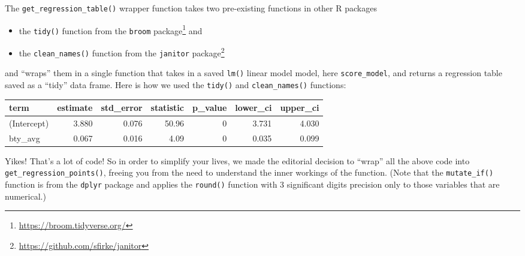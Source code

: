 \documentclass[12pt, krantz2,]{krantz}
\makeatletter
\newenvironment{Shaded}{\begin{snugshade}}{\end{snugshade}}
\newcommand{\DataTypeTok}[1]{\textcolor[rgb]{0.27,0.27,0.27}{#1}}
\newcommand{\DecValTok}[1]{\textcolor[rgb]{0.06,0.06,0.06}{#1}}
\newcommand{\KeywordTok}[1]{\textcolor[rgb]{0.27,0.27,0.27}{\textbf{#1}}}
\newcommand{\NormalTok}[1]{#1}
\newcommand{\OperatorTok}[1]{\textcolor[rgb]{0.43,0.43,0.43}{\textbf{#1}}}
\newcommand{\OtherTok}[1]{\textcolor[rgb]{0.37,0.37,0.37}{#1}}
\newcommand{\StringTok}[1]{\textcolor[rgb]{0.5,0.5,0.5}{#1}}
\providecommand{\tightlist}{%
  \setlength{\itemsep}{0pt}\setlength{\parskip}{0pt}}
\renewcommand{\href}[2]{#2\footnote{\url{#1}}}
\newenvironment{kframe}{%
\medskip{}
\setlength{\fboxsep}{.8em}
 \def\at@end@of@kframe{}%
 \ifinner\ifhmode%
  \def\at@end@of@kframe{\end{minipage}}%
  \begin{minipage}{\columnwidth}%
 \fi\fi%
 \def\FrameCommand##1{\hskip\@totalleftmargin \hskip-\fboxsep
 \colorbox{shadecolor}{##1}\hskip-\fboxsep
     \hskip-\linewidth \hskip-\@totalleftmargin \hskip\columnwidth}%
 \MakeFramed {\advance\hsize-\width
   \@totalleftmargin\z@ \linewidth\hsize
   \@setminipage}}%
 {\par\unskip\endMakeFramed%
 \at@end@of@kframe}
\renewenvironment{Shaded}{\begin{kframe}}{\end{kframe}}
\makeatother
\begin{document}
The \texttt{get\_regression\_table()} wrapper function takes two pre-existing functions in other R packages

\begin{itemize}
\tightlist
\item
  the \texttt{tidy()} function from the \href{https://broom.tidyverse.org/}{\texttt{broom} package} and
\item
  the \texttt{clean\_names()} function from the \href{https://github.com/sfirke/janitor}{\texttt{janitor} package}
\end{itemize}

and ``wraps'' them in a single function that takes in a saved \texttt{lm()} linear model model, here \texttt{score\_model}, and returns a regression table saved as a ``tidy'' data frame. Here is how we used the \texttt{tidy()} and \texttt{clean\_names()} functions:

\begin{Shaded}
\end{Shaded}

\begin{table}[H]
\centering\begingroup\fontsize{10}{12}\selectfont

\begin{tabular}{l|r|r|r|r|r|r}
\hline
term & estimate & std\_error & statistic & p\_value & lower\_ci & upper\_ci\\
\hline
(Intercept) & 3.880 & 0.076 & 50.96 & 0 & 3.731 & 4.030\\
\hline
bty\_avg & 0.067 & 0.016 & 4.09 & 0 & 0.035 & 0.099\\
\hline
\end{tabular}
\endgroup{}
\end{table}

Yikes! That's a lot of code! So in order to simplify your lives, we made the editorial decision to ``wrap'' all the above code into \texttt{get\_regression\_points()}, freeing you from the need to understand the inner workings of the function. (Note that the \texttt{mutate\_if()} function is from the \texttt{dplyr} package and applies the \texttt{round()} function with 3 significant digits precision only to those variables that are numerical.)
\end{document}
